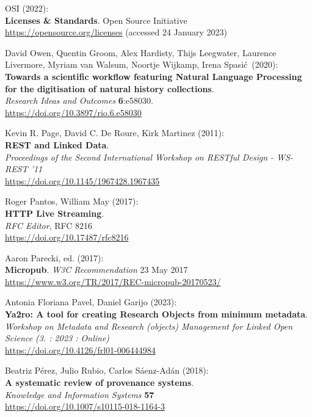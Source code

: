 \begin{thebibliography}{9}
OSI (2022): \\
\textbf{Licenses \& {Standards}}.
Open Source Initiative\\
\url{https://opensource.org/licenses} (accessed 24 January 2023)

David Owen, Quentin Groom, Alex Hardisty, Thijs Leegwater, Laurence Livermore, Myriam van Walsum, Noortje Wijkamp, Irena Spasić~(2020):\\
\textbf{Towards a scientific workflow featuring Natural
Language Processing for the digitisation of natural history collections}.\\
\emph{Research Ideas and Outcomes} \textbf{6}:e58030.\\
\url{https://doi.org/10.3897/rio.6.e58030}

Kevin R. Page, David C. De Roure, Kirk Martinez (2011): \\
\textbf{{REST} and {Linked Data}}. \\
\emph{Proceedings of the {Second International Workshop} on {RESTful Design} - {WS-REST} '11} \\
\url{https://doi.org/10.1145/1967428.1967435}

Roger Pantos, William May (2017): \\
\textbf{HTTP Live Streaming}. \\
\emph{RFC Editor}, RFC 8216\\
\url{https://doi.org/10.17487/rfc8216}

Aaron Parecki, ed. (2017): \\
\textbf{Micropub}. 
\emph{W3C Recommendation} 23 May 2017\\
\url{https://www.w3.org/TR/2017/REC-micropub-20170523/}

Antonia Floriana Pavel, Daniel Garijo (2023):\\
\textbf{Ya2ro: A tool for creating Research Objects from minimum metadata}.\\
\emph{Workshop on Metadata and Research (objects) Management for Linked Open Science (3. : 2023 : Online)}\\
\url{https://doi.org/10.4126/frl01-006444984}

Beatriz Pérez, Julio Rubio, Carlos Sáenz-Adán (2018):\\
\textbf{A systematic review of provenance systems}.\\
\emph{Knowledge and Information Systems} \textbf{57}\\
\url{https://doi.org/10.1007/s10115-018-1164-3} 


\end{thebibliography}
